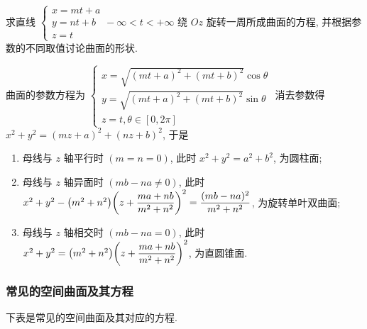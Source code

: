 \begin{example}
    求直线 $\begin{cases}
            x=mt+a \\
            y=nt+b \\
            z=t
        \end{cases}-\infty<t<+\infty$ 绕 $Oz$ 旋转一周所成曲面的方程, 并根据参数的不同取值讨论曲面的形状.
\end{example}
\begin{solution}
    曲面的参数方程为 $\begin{cases}
            x=\sqrt{(mt+a)^2+(mt+b)^2}\cos\theta \\
            y=\sqrt{(mt+a)^2+(mt+b)^2}\sin\theta \\
            z=t,\theta\in[0,2\pi]
        \end{cases}$
    消去参数得 $x^2+y^2=(mz+a)^2+(nz+b)^2$, 于是
    \begin{enumerate}[label=(\arabic{*})]
        \item 母线与 $z$ 轴平行时 $(m=n=0)$, 此时 $x^2+y^2=a^2+b^2$, 为圆柱面;
        \item 母线与 $z$ 轴异面时 $(mb-na\neq0)$, 此时 $x^2+y^2-\qty(m^2+n^2)\qty(z+\dfrac{ma+nb}{m^2+n^2})^2=\dfrac{(mb-na)^2}{m^2+n^2}$, 为旋转单叶双曲面;
        \item 母线与 $z$ 轴相交时 $(mb-na=0)$, 此时 $x^2+y^2=\qty(m^2+n^2)\qty(z+\dfrac{ma+nb}{m^2+n^2})^2$, 为直圆锥面.
    \end{enumerate}
\end{solution}

\subsubsection{常见的空间曲面及其方程}

下表是常见的空间曲面及其对应的方程.

